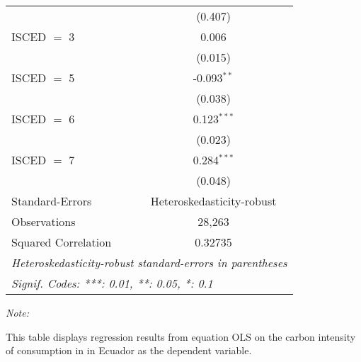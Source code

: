 \begin{table}[htbp!]
\begin{adjustbox}{width = 1\textwidth, max height = 0.95\textheight, center}
\begin{threeparttable}[b]
\begin{tabular}{lc}
                                & (0.407)\\   
            ISCED $=$ 3         & 0.006\\   
                                & (0.015)\\   
            ISCED $=$ 5         & -0.093$^{**}$\\   
                                & (0.038)\\   
            ISCED $=$ 6         & 0.123$^{***}$\\   
                                & (0.023)\\   
            ISCED $=$ 7         & 0.284$^{***}$\\   
                                & (0.048)\\   
            \midrule 
            Standard-Errors     & Heteroskedasticity-robust \\   
            Observations        & 28,263\\  
            Squared Correlation & 0.32735\\  
            \midrule \midrule
            \multicolumn{2}{l}{\emph{Heteroskedasticity-robust standard-errors in parentheses}}\\
            \multicolumn{2}{l}{\emph{Signif. Codes: ***: 0.01, **: 0.05, *: 0.1}}\\
         \end{tabular}
         
         \begin{tablenotes}\item \medskip \textit{Note:}
            \item This table displays regression results from equation OLS on the carbon intensity of consumption in  in Ecuador as the dependent variable. 
         \end{tablenotes}
      \end{threeparttable}
   \end{adjustbox}
\end{table}


